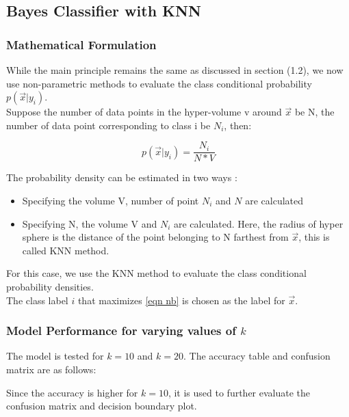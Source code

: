 \documentclass[11pt,a4paper]{article}
\newcommand{\noi}{\noindent}
\begin{document}
\subsection{Bayes Classifier with KNN}
\subsubsection{Mathematical Formulation}
While the main principle remains the same as discussed in section (1.2), we now use non-parametric methods to evaluate the class conditional probability $p(\vec{x}|y_{i})$.
\\Suppose the number of data points in the hyper-volume v around $\vec{x}$ be N, the number of data point corresponding to class i be $N_i$, then:

\begin{equation}
    p(\vec{x}|y_{i})=\frac{N_{i}}{N*V}
\end{equation}

The probability density can be estimated in two ways :
\begin{itemize}
    \itemsep0em
    \item Specifying the volume V, number of point $N_i$ and $N$ are calculated
    \item Specifying N, the volume V and $N_i$ are calculated. Here, the radius of hyper sphere is the distance of the point belonging to N farthest from $\vec{x}$, this is called KNN method.  
\end{itemize}

\noi
For this case, we use the KNN method to evaluate the class conditional probability densities.
\\ 
The class label $i$ that maximizes \autoref{eqn nb} is chosen as the label for $\vec{x}$. 

\subsubsection{Model Performance for varying values of $k$}
The model is tested for $k=10$ and $k=20$. The accuracy table and confusion matrix are as follows:


\noi
Since the accuracy is higher for $k=10$, it is used to further evaluate the confusion matrix and decision boundary plot. 
\end{document}
